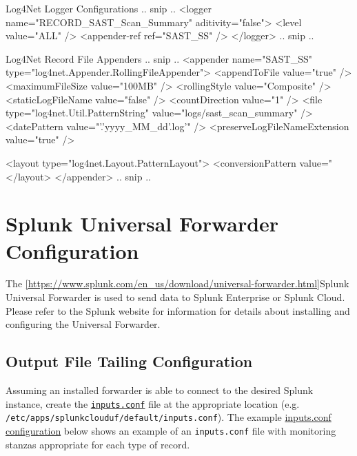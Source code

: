 \begin{code}{Log4Net Logger Configurations}{\label{lst:record_loggers}}{}
.. snip ..
<logger name="RECORD_SAST_Scan_Summary" aditivity="false">
    <level value="ALL" />
    <appender-ref ref="SAST_SS" />
</logger>
  .. snip ..
\end{code}


\begin{code}{Log4Net Record File Appenders}{\label{lst:record_appenders}}{}
.. snip ..
<appender name="SAST_SS" type="log4net.Appender.RollingFileAppender">
    <appendToFile value="true" />
    <maximumFileSize value="100MB" />
    <rollingStyle value="Composite" />
    <staticLogFileName value="false" />
    <countDirection value="1" />
    <file type="log4net.Util.PatternString" value="logs/sast_scan_summary" />
    <datePattern value="'.'yyyy_MM_dd'.log'" />
    <preserveLogFileNameExtension value="true" />

    <layout type="log4net.Layout.PatternLayout">
        <conversionPattern value="%
    </layout>
</appender>
.. snip ..
\end{code}

\section{Splunk Universal Forwarder Configuration}
The \ref{https://www.splunk.com/en_us/download/universal-forwarder.html}{Splunk Universal Forwarder} is used to send data to Splunk Enterprise or Splunk Cloud.  
Please refer to the Splunk website for information for details about installing and configuring the Universal Forwarder.


\subsection{Output File Tailing Configuration}

Assuming an installed forwarder is able to connect to the desired Splunk instance, 
create the \href{https://docs.splunk.com/Documentation/Splunk/latest/Admin/Inputsconf}{\texttt{inputs.conf}} file at the appropriate location 
(e.g. \texttt{/etc/apps/splunkclouduf/default/inputs.conf}).  The example \hyperref[lst:inputsconf]{inputs.conf configuration} below shows an example of 
an \texttt{inputs.conf} file with monitoring stanzas appropriate for each type of record. 


